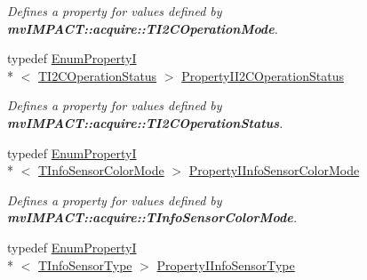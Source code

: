\begin{DoxyCompactItemize}
\begin{DoxyCompactList}\small\item\em Defines a property for values defined by {\bfseries mv\+I\+M\+P\+A\+C\+T\+::acquire\+::\+T\+I2\+C\+Operation\+Mode}. \end{DoxyCompactList}\item 
\hypertarget{group___device_specific_interface_ga4e0a176291dd65f15a0fddf3c1d552a1}{typedef \hyperlink{classmv_i_m_p_a_c_t_1_1acquire_1_1_enum_property_i}{Enum\+Property\+I}\\*
$<$ \hyperlink{group___device_specific_interface_ga141afcf1d25294043818cb39a26914af}{T\+I2\+C\+Operation\+Status} $>$ \hyperlink{group___device_specific_interface_ga4e0a176291dd65f15a0fddf3c1d552a1}{Property\+I\+I2\+C\+Operation\+Status}}\label{group___device_specific_interface_ga4e0a176291dd65f15a0fddf3c1d552a1}

\begin{DoxyCompactList}\small\item\em Defines a property for values defined by {\bfseries mv\+I\+M\+P\+A\+C\+T\+::acquire\+::\+T\+I2\+C\+Operation\+Status}. \end{DoxyCompactList}\item 
\hypertarget{group___device_specific_interface_gaf05019cc6b863ccf692d8705e7ae6c57}{typedef \hyperlink{classmv_i_m_p_a_c_t_1_1acquire_1_1_enum_property_i}{Enum\+Property\+I}\\*
$<$ \hyperlink{group___device_specific_interface_ga45dccb9c972f4e6cb713da77a694c1e6}{T\+Info\+Sensor\+Color\+Mode} $>$ \hyperlink{group___device_specific_interface_gaf05019cc6b863ccf692d8705e7ae6c57}{Property\+I\+Info\+Sensor\+Color\+Mode}}\label{group___device_specific_interface_gaf05019cc6b863ccf692d8705e7ae6c57}

\begin{DoxyCompactList}\small\item\em Defines a property for values defined by {\bfseries mv\+I\+M\+P\+A\+C\+T\+::acquire\+::\+T\+Info\+Sensor\+Color\+Mode}. \end{DoxyCompactList}\item 
\hypertarget{group___device_specific_interface_ga071d509608754cf5b0d258cc0ac39726}{typedef \hyperlink{classmv_i_m_p_a_c_t_1_1acquire_1_1_enum_property_i}{Enum\+Property\+I}\\*
$<$ \hyperlink{group___device_specific_interface_gaa1c7fc61c4ab1828d517f3b15909a1a5}{T\+Info\+Sensor\+Type} $>$ \hyperlink{group___device_specific_interface_ga071d509608754cf5b0d258cc0ac39726}{Property\+I\+Info\+Sensor\+Type}}\label{group___device_specific_interface_ga071d509608754cf5b0d258cc0ac39726}


\end{DoxyCompactItemize}
